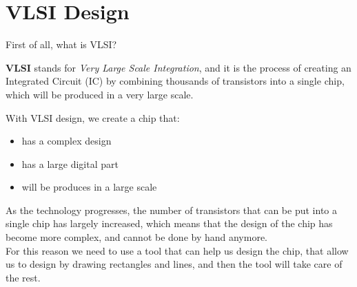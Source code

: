 \chapter{VLSI Design}
First of all, what is VLSI?\\
\begin{boxH}
  \textbf{VLSI} stands for \textit{Very Large Scale Integration}, and it is the process of creating an 
  Integrated Circuit (IC) by combining thousands of transistors into a single chip, which will
  be produced in a very large scale.
\end{boxH}
With VLSI design, we create a chip that:
\begin{itemize}
  \item has a complex design
  \item has a large digital part
  \item will be produces in a large scale
\end{itemize}
As the technology progresses, the number of transistors that can be put into a single chip
has largely increased, which means that the design of the chip has become more complex, and cannot 
be done by hand anymore.\\
For this reason we need to use a tool that can help us design the chip, that allow us to design 
by drawing rectangles and lines, and then the tool will take care of the rest.
